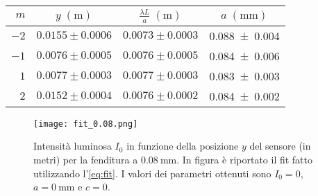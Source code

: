 \documentclass[../main.tex]{subfiles}
\begin{document}
\begin{table}[ht!]
    \centering
    \caption{}
    \begin{tabular}{r|cc|c}
        \toprule
        $m$  & $y \; (\si{\metre})$ & $\frac{\lambda L}{a} \; (\si{\metre})$ & $a \; (\si{\mm})$ \\
        \midrule
        $-2$ & $0.0155 \pm 0.0006$ & $0.0073 \pm 0.0003$ & \num{0.088+-0.004} \\
        $-1$ & $0.0076 \pm 0.0005$ & $0.0076 \pm 0.0005$ & \num{0.084+-0.006} \\
        $1$  & $0.0077 \pm 0.0003$ & $0.0077 \pm 0.0003$ & \num{0.083+-0.003} \\
        $2$  & $0.0152 \pm 0.0004$ & $0.0076 \pm 0.0002$ & \num{0.084+-0.002} \\
        \bottomrule
    \end{tabular}
    \label{tab:minimi 0.08}
\end{table}



\begin{figure}[ht!]
    \centering
    \texttt{[image: fit\_0.08.png]}
    \caption{Intensità luminosa $I_{0}$ in funzione della posizione $y$ del sensore (in metri) per la fenditura a $\qty{0.08}{\mm}$. In figura è riportato il fit fatto utilizzando l'\autoref{eq:fit}. I valori dei parametri ottenuti sono $I_{0} = \num{0}$, $a = \qty{0}{\mm}$ e $c = \num{0}$. }
    \label{fig:fit 0.08}
\end{figure}

\end{document}
